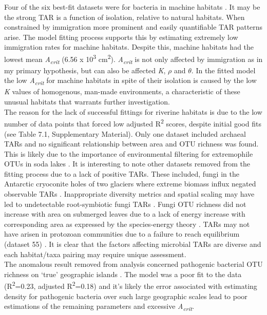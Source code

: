 \noindent Four of the six best-fit datasets were for bacteria in machine habitats \cite{van2006bacterial} \cite{van2005island}. It may be the strong TAR is a function of isolation, relative to natural habitats. When constrained by immigration more prominent and easily quantifiable TAR patterns arise. The model fitting process supports this by estimating extremely low immigration rates for machine habitats. Despite this, machine habitats had the lowest mean \textit{A\textsubscript{crit}} (6.56 x 10\textsuperscript{3} cm\textsuperscript{2}). \textit{A\textsubscript{crit}} is not only affected by immigration as in my primary hypothesis, but can also be affected \textit{K}, $\rho$ and $\theta$. In the fitted model the low \textit{A\textsubscript{crit}} for machine habitats in spite of their isolation is caused by the low \textit{K} values of homogenous, man-made environments, a characteristic of these unusual habitats that warrants further investigation. \\

\noindent The reason for the lack of successful fittings for riverine habitats is due to the low number of data points that forced low adjusted R\textsuperscript{2} scores, despite initial good fits (see Table 7.1, Supplementary Material). Only one dataset included archaeal TARs and no significant relationship between area and OTU richness was found. This is likely due to the importance of environmental filtering for extremophile OTUs in soda lakes \cite{LanzenAnders2013SPaE}. It is interesting to note other datasets removed from the fitting process due to a lack of positive TARs. These included, fungi in the Antarctic cryoconite holes of two glaciers where extreme biomass influx negated observable TARs \cite{darcy2018island}. Inappropriate diversity metrics and spatial scaling may have led to undetectable root-symbiotic fungi TARs \cite{davison2018microbial}. Fungi OTU richness did not increase with area on submerged leaves due to a lack of energy increase with corresponding area as expressed by the species-energy theory \cite{FeinsteinLarryM2012Tran}  \cite{wright1983species}. TARs may not have arisen in protozoan communities due to a failure to reach equilibrium (dataset 55) \cite{henebry1980effect}. It is clear that the factors affecting microbial TARs are diverse and each habitat/taxa pairing may require unique assessment. \\ 

\noindent The anomalous result removed from analysis concerned pathogenic bacterial OTU richness on `true' geographic islands \cite{jean2016equilibrium}. The model was a poor fit to the data (R\textsuperscript{2}=0.23, adjusted R\textsuperscript{2}=0.18) and it's likely the error associated with estimating density for pathogenic bacteria over such large geographic scales lead to poor estimations of the remaining parameters and excessive \textit{A\textsubscript{crit}}.   \\

